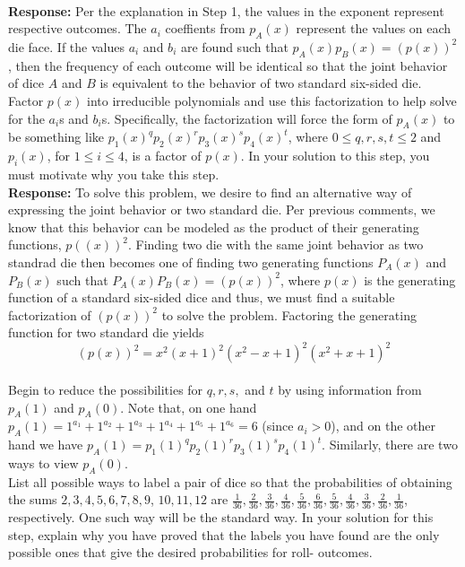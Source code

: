 \documentclass{article}
\newcommand{\response}[1]{\leavevmode\\[0.05in]{\bf Response: } #1 \leavevmode\\[0.05in]}
\begin{document}
\response{Per the explanation in Step 1, the values in the exponent represent respective outcomes.  The $a_i$ coeffients from $p_A(x)$ represent the values on each die face.  If the values $a_i$ and $b_i$ are found such that $p_A(x)p_B(x) = (p(x))^2$, then the frequency of each outcome will be identical so that the joint behavior of dice $A$ and $B$ is equivalent to the behavior of two standard six-sided die.}
  Factor $p(x)$ into irreducible polynomials and use this factorization to help solve for the $a_i$s and $b_i$s. Specifically, the factorization will force the form of $p_A(x)$ to be something like $p_1(x)^qp_2(x)^rp_3(x)^sp_4(x)^t$, where $0 \leq q,r,s,t \leq 2$ and $p_i(x)$, for $1 \leq i \leq 4$, is a factor of $p(x)$.  In your solution to this step, you must motivate why you take this step. 
\response{To solve this problem, we desire to find an alternative way of expressing the joint behavior or two standard die. Per previous comments, we know that this behavior can be modeled as the product of their generating functions, $p((x))^2$. Finding two die with the same joint behavior as two standrad die then becomes one of finding two generating functions $P_A(x)$ and $P_B(x)$ such that $P_A(x)P_B(x) = (p(x))^2$, where $p(x)$ is the generating function of a standard six-sided dice and thus, we must find a suitable factorization of $(p(x))^2$ to solve the problem. Factoring the generating function for two standard die yields
\begin{equation*}
	(p(x))^2 = x^2(x + 1)^2(x^2 - x + 1)^2(x^2 + x + 1)^2
\end{equation*}}
 Begin to reduce the possibilities for $q,r,s,$ and $t$ by using information from $p_A(1)$ and $p_A(0)$.  Note that, on one hand $p_A(1) = 1^{a_1} + 1^{a_2} + 1^{a_3} + 1^{a_4} + 1^{a_5}+1^{a_6} = 6$ (since $a_i > 0$), and on the other hand we have $p_A(1) = p_1(1)^qp_2(1)^rp_3(1)^sp_4(1)^t$.  Similarly, there are two ways to view $p_A(0)$.\\
 List all possible ways to label a pair of dice so that the probabilities of obtaining the sums $2, 3, 4, 5, 6, 7, 8, 9$, $10, 11, 12$ are $\frac{1}{36}, \frac{2}{36}, \frac{3}{36}, \frac{4}{36}, \frac{5}{36}, \frac{6}{36}, \frac{5}{36}, \frac{4}{36}, \frac{3}{36}, \frac{2} {36},\frac{1}{36}$, respectively.  One such way will be the standard way.  In your solution for this step, explain why you have proved that the labels you have found are the only possible ones that give the desired probabilities for roll- outcomes.
\vspace{2em}
\end{document}
